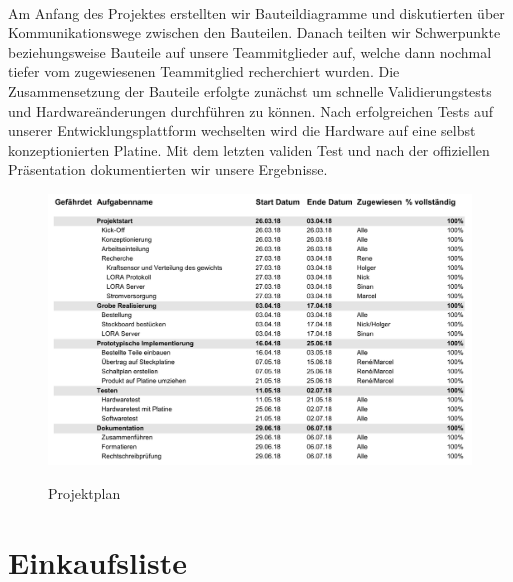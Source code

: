 \\
Am Anfang des Projektes erstellten wir Bauteildiagramme und diskutierten über Kommunikationswege zwischen den Bauteilen. Danach teilten wir Schwerpunkte beziehungsweise Bauteile auf unsere Teammitglieder auf, welche dann nochmal tiefer vom zugewiesenen Teammitglied recherchiert wurden. Die Zusammensetzung der Bauteile erfolgte zunächst um schnelle Validierungstests und Hardwareänderungen durchführen zu können. Nach erfolgreichen Tests auf unserer Entwicklungsplattform wechselten wird die Hardware auf eine selbst konzeptionierten Platine. Mit dem letzten validen Test und nach der offiziellen Präsentation dokumentierten wir unsere Ergebnisse.

\begin{figure}[ht]
    \center
    \includegraphics[width=15cm]{Bilder/projektplan.png}\\
    \caption{Projektplan}
    \label{fig:Projektplan}
\end{figure}
\chapter{Einkaufsliste}

